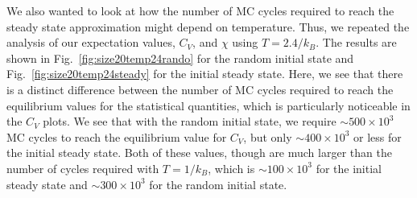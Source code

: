 \documentclass[12pt]{article}
\numberwithin{equation}{section}
\begin{document}
\par We also wanted to look at how the number of MC cycles required to reach the steady state approximation might depend on temperature.  Thus, we repeated the analysis of our expectation values, $C_{V}$, and $\chi$ using $T=2.4/k_{B}$.  The results are shown in Fig.~\ref{fig:size20temp24rando} for the random initial state and Fig.~\ref{fig:size20temp24steady} for the initial steady state. Here, we see that there is a distinct difference between the number of MC cycles required to reach the equilibrium values for the statistical quantities, which is particularly noticeable in the $C_{V}$ plots.  We see that with the random initial state, we require $\sim500\times10^{3}$ MC cycles to reach the equilibrium value for $C_{V}$, but only $\sim400\times10^{3}$ or less for the initial steady state.  Both of these values, though are much larger than the number of cycles required with $T=1/k_{B}$, which is $\sim100\times10^{3}$ for the initial steady state and $\sim 300\times10^{3}$ for the random initial state.  
\end{document}
